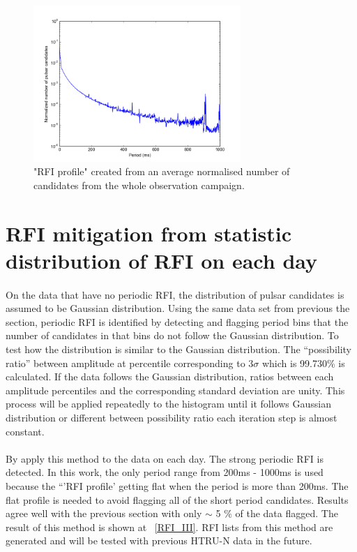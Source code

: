 \documentclass[thesis_msc.tex]{subfiles}
\begin{document}
\begin{figure}[h!] 
\centering
\includegraphics[width=0.7\textwidth]{figures/mean_profile.png}
\caption{"RFI profile" created from an average normalised number of candidates from the whole observation campaign.}
\label{RFI_profile}
\end{figure}

    \section{RFI mitigation from statistic distribution of RFI on each day}
    \paragraph{} On the data that have no periodic RFI, the distribution of pulsar candidates is assumed to be Gaussian distribution. Using the same data set from previous the section, periodic RFI is identified by detecting and flagging period bins that the number of candidates in that bins do not follow the Gaussian distribution. To test how the distribution is similar to the Gaussian distribution. The ``possibility ratio'' between amplitude at percentile corresponding to $3\sigma$ which is 99.730\% is calculated. If the data follows the Gaussian distribution, ratios between each amplitude percentiles and the corresponding standard deviation are unity. This process will be applied repeatedly to the histogram until it follows Gaussian distribution or different between possibility ratio each iteration step is almost constant.
    \paragraph{} By apply this method to the data on each day. The strong periodic RFI is detected. In this work, the only period range from 200ms - 1000ms is used because the ``'RFI profile' getting flat when the period is more than 200ms. The flat profile is needed to avoid flagging all of the short period candidates. Results agree well with the previous section with only $\sim$ 5 $\%$ of the data flagged. The result of this method is shown at ~\ref{RFI_III}. RFI lists from this method are generated and will be tested with previous HTRU-N data in the future. 
 
\end{document}
